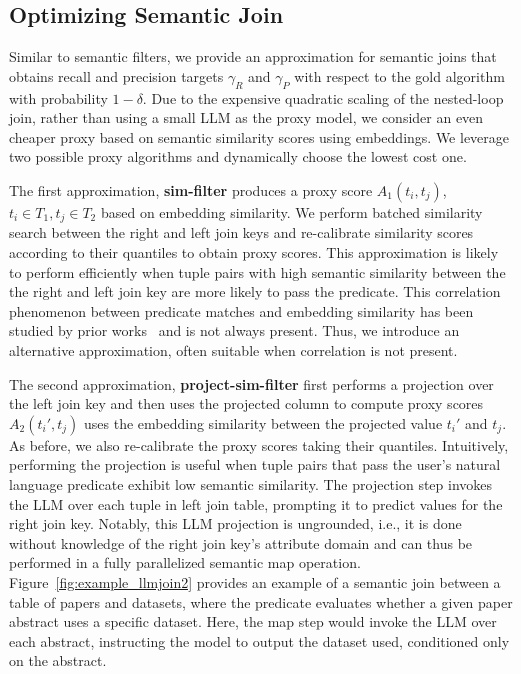 \subsection{Optimizing Semantic Join}

Similar to semantic filters, we provide an approximation for semantic joins that obtains recall and precision targets $\gamma_R$ and $\gamma_P$ with respect to the gold algorithm with probability $1-\delta$. Due to the expensive quadratic scaling of the nested-loop join, rather than using a small LLM as the proxy model, we consider an even cheaper proxy based on semantic similarity scores using embeddings. 
We leverage two possible proxy algorithms and dynamically choose the lowest cost one. 

The first approximation, \textbf{sim-filter} produces a proxy score $A_1(t_i, t_j)$, $t_i\in T_1, t_j\in T_2$ based on embedding similarity. We perform batched similarity search between the right and left join keys and re-calibrate similarity scores according to their quantiles to obtain proxy scores. 
This approximation is likely to perform efficiently when tuple pairs with high semantic similarity between the the right and left join key are more likely to pass the predicate. This correlation phenomenon between predicate matches and embedding similarity has been studied by prior works~\cite{patel_acorn_2024} and is not always present. Thus, we introduce an alternative approximation, often suitable when correlation is not present.

The second approximation, \textbf{project-sim-filter} first performs a projection over the left join key and then uses the projected column to compute proxy scores $A_2(t_i', t_j)$ uses the embedding similarity between the projected value $t_i'$ and $t_j$. As before, we also re-calibrate the proxy scores taking their quantiles.
Intuitively, performing the projection is useful when tuple pairs that pass the user's natural language predicate exhibit low semantic similarity. The projection step invokes the LLM over each tuple in left join table, prompting it to predict values for the right join key. Notably, this LLM projection is ungrounded, i.e., it is done without knowledge of the right join key's attribute domain and can thus be performed in a fully parallelized semantic map operation. 
Figure~\ref{fig:example_llmjoin2} provides an example of a semantic join between a table of papers and datasets, where the predicate evaluates whether a given paper abstract uses a specific dataset. Here, the map step would invoke the LLM over each abstract, instructing the model to output the dataset used, conditioned only on the abstract. 

